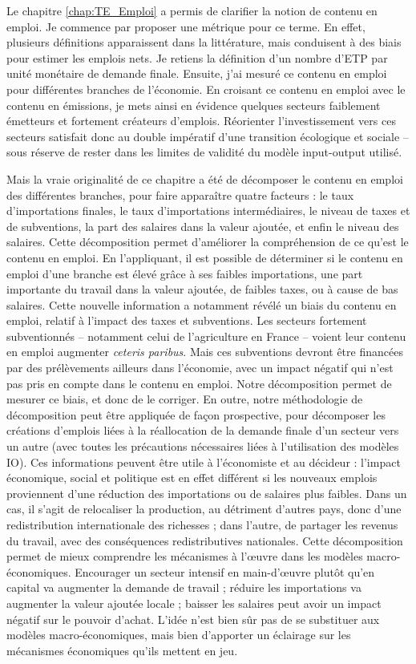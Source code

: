 Le chapitre \ref{chap:TE_Emploi} a permis de clarifier la notion de contenu en emploi.  Je commence par proposer une métrique pour ce terme. En effet, plusieurs définitions apparaissent dans la littérature, mais conduisent à des biais pour estimer les emplois nets. Je retiens la définition d’un nombre d’ETP par unité monétaire de demande finale.
Ensuite, j’ai mesuré ce contenu en emploi pour différentes branches de l’économie. En croisant ce contenu en emploi avec le contenu en émissions, je mets ainsi en évidence quelques secteurs faiblement émetteurs et fortement créateurs d’emplois. Réorienter l’investissement vers ces secteurs satisfait donc au double impératif d’une transition écologique et sociale – sous réserve de rester dans les limites de validité du modèle input-output utilisé.

Mais la vraie originalité de ce chapitre a été de décomposer le contenu en emploi des différentes branches, pour faire apparaître quatre facteurs : le taux d’importations finales, le taux d’importations intermédiaires, le niveau de taxes et de subventions, la part des salaires dans la valeur ajoutée, et enfin le niveau des salaires.
Cette décomposition permet d’améliorer la compréhension de ce qu’est le contenu en emploi. En l’appliquant, il est possible de déterminer si le contenu en emploi d’une branche est élevé grâce à ses faibles importations, une part importante du travail dans la valeur ajoutée, de faibles taxes, ou à cause de bas salaires.
Cette nouvelle information a notamment révélé un biais du contenu en emploi, relatif à l’impact des taxes et subventions. Les secteurs fortement subventionnés -- notamment celui de l'agriculture en France -- voient leur contenu en emploi augmenter \textit{ceteris paribus}. Mais ces subventions devront être financées par des prélèvements ailleurs dans l’économie, avec un impact négatif qui n’est pas pris en compte dans le contenu en emploi. Notre décomposition permet de mesurer ce biais, et donc de le corriger. 
En outre, notre méthodologie de décomposition peut être appliquée de façon prospective, pour décomposer les créations d’emplois liées à la réallocation de la demande finale d’un secteur vers un autre (avec toutes les précautions nécessaires liées à l’utilisation des modèles IO). Ces informations peuvent être utile à l’économiste et au décideur : l’impact économique, social et politique est en effet différent si les nouveaux emplois proviennent d’une réduction des importations ou de salaires plus faibles. Dans un cas, il s’agit de relocaliser la production, au détriment d’autres pays, donc d’une redistribution internationale des richesses ; dans l’autre, de partager les revenus du travail, avec des conséquences redistributives nationales.
Cette décomposition permet de mieux comprendre les mécanismes à l’œuvre dans les modèles macro-économiques. Encourager un secteur intensif en main-d’œuvre plutôt qu’en capital va augmenter la demande de travail ; réduire les importations va augmenter la valeur ajoutée locale ; baisser les salaires peut avoir un impact négatif sur le pouvoir d’achat. L’idée n’est bien sûr pas de se substituer aux modèles macro-économiques, mais bien d’apporter un éclairage sur les mécanismes économiques qu’ils mettent en jeu.


